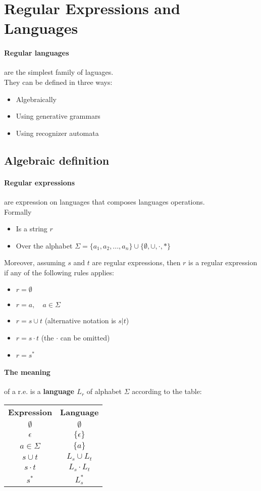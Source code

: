 \documentclass{article}
\begin{document}
\section{Regular Expressions and Languages}
\paragraph{Regular languages} are the simplest family of laguages.\\
They can be defined in three ways:
\begin{itemize}
\item Algebraically
\item Using generative grammars
\item Using recognizer automata
\end{itemize}
\subsection{Algebraic definition}
\paragraph{Regular expressions} are expression on languages that composes languages operations.\\
Formally
\begin{itemize}
\item Is a string $r$
\item Over the alphabet $\Sigma=\{a_1,a_2,...,a_n\} \cup \{\emptyset, \cup, \cdot, *\}$
\end{itemize}
Moreover, assuming $s$ and $t$ are regular expressions, then $r$ is a regular expression if any of the following rules applies:
\begin{itemize}
\item $r=\emptyset$
\item $r=a, \quad a \in \Sigma$
\item $r=s \cup t$ (alternative notation is $s|t$)
\item $r=s \cdot t$ (the $\cdot$ can be omitted)
\item $r=s^*$
\end{itemize}
\paragraph{The meaning} of a r.e. is a \textbf{language $L_r$} of alphabet $\Sigma$ according to the table:
\begin{table}[h!]
\begin{center}
\begin{tabular}{cc}
\textbf{Expression}	& 	\textbf{Language}\\
$\emptyset$			&	$\emptyset$\\
$\epsilon$			&	$\{\epsilon\}$\\
$a\in \Sigma$		&	$\{a\}$\\
$s \cup t$			&	$L_s \cup L_t$\\
$s \cdot t$			&	$L_s \cdot L_t$\\
$s^*$				&	$L_s^*$\\
\end{tabular}
\end{center}
\end{table}
\end{document}
